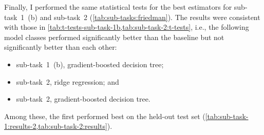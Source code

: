 Finally, I performed the same statistical tests for the best estimators for
sub-task~1~(b) and sub-task~2 (\cref{tab:sub-tasks:friedman}).
The results were consistent with those in
\cref{tab:t-tests-sub-task-1b,tab:sub-task-2:t-tests}, i.e., the following model classes
performed significantly better than the baseline but not significantly better than
each other:
\begin{itemize}
  \item sub-task~1~(b), gradient-boosted decision tree;
  \item sub-task~2, ridge regression; and
  \item sub-task~2, gradient-boosted decision tree.
\end{itemize}
Among these, the first performed best on the held-out test set
(\cref{tab:sub-task-1:results-2,tab:sub-task-2:results}).

\begin{landscape}
  \begin{table}
    \centering
    
    \caption{The $t$-statistics from paired $t$-tests, and $p$-values from the Nemenyi test, on the
      mean scores of the best estimators for sub-tasks~1~(b) and 2.
      As elsewhere, a positive $t$-statistic indicates that `Model B' achieved a lower mean
      score than `Model A'.
    }
    \label{tab:sub-tasks:friedman}
  \end{table}
\end{landscape}
